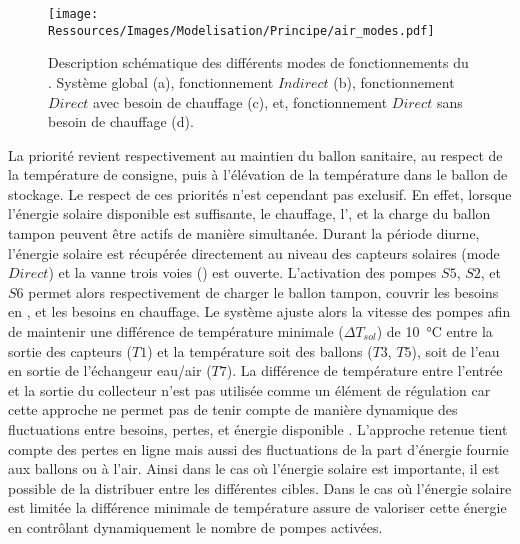 \begin{figure}[tb]
    \centering
    \texttt{[image: Ressources/Images/Modelisation/Principe/air\_modes.pdf]}
    \caption[Description schématique des différents modes de fonctionnements du ]
            {Description schématique des différents modes de fonctionnements du . Système
             global (a), fonctionnement $Indirect$ (b), fonctionnement $Direct$ avec besoin de
             chauffage (c), et, fonctionnement $Direct$ sans besoin de chauffage (d).}
    \label{fig:schema_modes}
\end{figure}

La priorité revient respectivement au maintien du ballon sanitaire, au respect de la température de
consigne, puis à l’élévation de la température dans le ballon de stockage. Le respect de
ces priorités n’est cependant pas exclusif. En effet, lorsque l’énergie solaire disponible est
suffisante, le chauffage, l’, et la charge du ballon tampon peuvent être actifs de
manière simultanée.
Durant la période diurne, l’énergie solaire est récupérée directement au niveau des
capteurs solaires (mode $Direct$) et la vanne trois voies () est ouverte.
L’activation des pompes $S5$, $S2$, et $S6$ permet alors respectivement de charger le
ballon tampon, couvrir les besoins en , et les besoins en chauffage. Le système
ajuste alors la vitesse des pompes afin de maintenir une différence de température minimale
($\Delta T_{sol}$) de \SI{10}{\celsius} entre la sortie des capteurs ($T1$) et la
température soit des ballons ($T3$, $T5$), soit de l’eau en sortie de l’échangeur eau/air ($T7$).
La différence de
température entre l’entrée et la sortie du collecteur n’est pas utilisée comme un élément
de régulation car cette approche ne permet pas de tenir compte de manière dynamique
des fluctuations entre besoins, pertes, et énergie disponible \parencite{Mosallat2013686}.
L’approche retenue tient compte des pertes en ligne mais aussi des
fluctuations de la part d’énergie fournie aux ballons ou à l’air. Ainsi dans le cas où
l’énergie solaire est importante, il est possible de la distribuer entre les différentes
cibles. Dans le cas où l’énergie solaire est limitée la différence minimale de température
assure de valoriser cette énergie en contrôlant dynamiquement le nombre de pompes activées.

